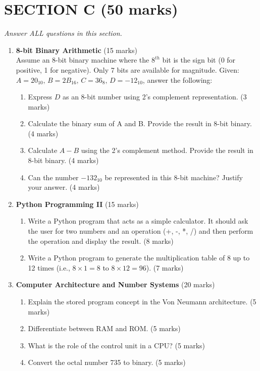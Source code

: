 \documentclass[12pt]{article}
\begin{document}
\newpage

\section*{SECTION C (50 marks)}
\textit{Answer ALL questions in this section.}

\begin{enumerate}[left=0pt, label=\bfseries Q\arabic*.]
    \item \textbf{8-bit Binary Arithmetic} \hfill (15 marks)\\
          Assume an 8-bit binary machine where the \( 8^{th} \) bit is the sign bit (0 for positive, 1 for negative). Only 7 bits are available for magnitude. Given: \( A = 20_{10}, \, B = 2B_{16}, \, C = 36_{8}, \, D = -12_{10} \), answer the following:
          \begin{enumerate}[label=(\alph*)]
              \item Express \( D \) as an 8-bit number using 2’s complement representation. \hfill (3 marks)
              \item Calculate the binary sum of A and B. Provide the result in 8-bit binary. \hfill (4 marks)
              \item Calculate \( A - B \) using the 2’s complement method. Provide the result in 8-bit binary. \hfill (4 marks)
              \item Can the number \( -132_{10} \) be represented in this 8-bit machine? Justify your answer. \hfill (4 marks)
          \end{enumerate}

    \item \textbf{Python Programming II} \hfill (15 marks)\\
          \begin{enumerate}[label=(\alph*)]
              \item Write a Python program that acts as a simple calculator. It should ask the user for two numbers and an operation (+, -, *, /) and then perform the operation and display the result. \hfill (8 marks)
              \item Write a Python program to generate the multiplication table of 8 up to 12 times (i.e., \(8 \times 1 = 8\) to \(8 \times 12 = 96\)). \hfill (7 marks)
          \end{enumerate}

    \item \textbf{Computer Architecture and Number Systems} \hfill (20 marks)\\
          \begin{enumerate}[label=(\alph*)]
              \item Explain the stored program concept in the Von Neumann architecture. \hfill (5 marks)
              \item Differentiate between RAM and ROM. \hfill (5 marks)
              \item What is the role of the control unit in a CPU? \hfill (5 marks)
              \item Convert the octal number 735 to binary. \hfill (5 marks)
          \end{enumerate}
\end{enumerate}
\end{document}
